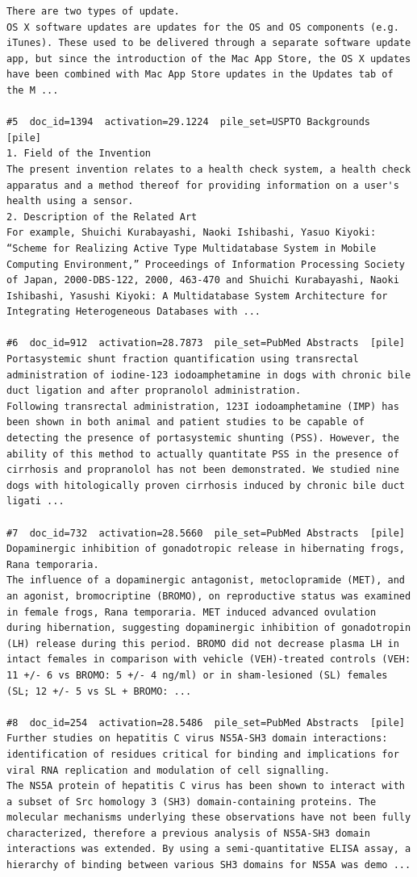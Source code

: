 \begin{verbatim}
There are two types of update.
OS X software updates are updates for the OS and OS components (e.g. iTunes). These used to be delivered through a separate software update app, but since the introduction of the Mac App Store, the OS X updates have been combined with Mac App Store updates in the Updates tab of the M ...

#5  doc_id=1394  activation=29.1224  pile_set=USPTO Backgrounds  [pile]
1. Field of the Invention
The present invention relates to a health check system, a health check apparatus and a method thereof for providing information on a user's health using a sensor.
2. Description of the Related Art
For example, Shuichi Kurabayashi, Naoki Ishibashi, Yasuo Kiyoki: “Scheme for Realizing Active Type Multidatabase System in Mobile Computing Environment,” Proceedings of Information Processing Society of Japan, 2000-DBS-122, 2000, 463-470 and Shuichi Kurabayashi, Naoki Ishibashi, Yasushi Kiyoki: A Multidatabase System Architecture for Integrating Heterogeneous Databases with ...

#6  doc_id=912  activation=28.7873  pile_set=PubMed Abstracts  [pile]
Portasystemic shunt fraction quantification using transrectal administration of iodine-123 iodoamphetamine in dogs with chronic bile duct ligation and after propranolol administration.
Following transrectal administration, 123I iodoamphetamine (IMP) has been shown in both animal and patient studies to be capable of detecting the presence of portasystemic shunting (PSS). However, the ability of this method to actually quantitate PSS in the presence of cirrhosis and propranolol has not been demonstrated. We studied nine dogs with hitologically proven cirrhosis induced by chronic bile duct ligati ...

#7  doc_id=732  activation=28.5660  pile_set=PubMed Abstracts  [pile]
Dopaminergic inhibition of gonadotropic release in hibernating frogs, Rana temporaria.
The influence of a dopaminergic antagonist, metoclopramide (MET), and an agonist, bromocriptine (BROMO), on reproductive status was examined in female frogs, Rana temporaria. MET induced advanced ovulation during hibernation, suggesting dopaminergic inhibition of gonadotropin (LH) release during this period. BROMO did not decrease plasma LH in intact females in comparison with vehicle (VEH)-treated controls (VEH: 11 +/- 6 vs BROMO: 5 +/- 4 ng/ml) or in sham-lesioned (SL) females (SL; 12 +/- 5 vs SL + BROMO: ...

#8  doc_id=254  activation=28.5486  pile_set=PubMed Abstracts  [pile]
Further studies on hepatitis C virus NS5A-SH3 domain interactions: identification of residues critical for binding and implications for viral RNA replication and modulation of cell signalling.
The NS5A protein of hepatitis C virus has been shown to interact with a subset of Src homology 3 (SH3) domain-containing proteins. The molecular mechanisms underlying these observations have not been fully characterized, therefore a previous analysis of NS5A-SH3 domain interactions was extended. By using a semi-quantitative ELISA assay, a hierarchy of binding between various SH3 domains for NS5A was demo ...


\end{verbatim}
